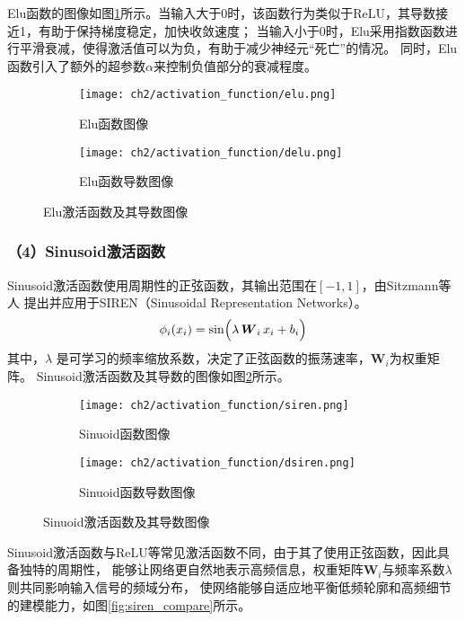 Elu函数的图像如图\ref{fig:elu}所示。当输入大于0时，该函数行为类似于ReLU，其导数接近1，有助于保持梯度稳定，加快收敛速度；
当输入小于0时，Elu采用指数函数进行平滑衰减，使得激活值可以为负，有助于减少神经元“死亡”的情况。
同时，Elu函数引入了额外的超参数$\alpha$来控制负值部分的衰减程度。

\begin{figure}[H]
  \centering
  \begin{subfigure}[t]{0.45\textwidth}
    \centering
    \texttt{[image: ch2/activation\_function/elu.png]}
    \caption{Elu函数图像}
  \end{subfigure}
  \begin{subfigure}[t]{0.45\textwidth}
    \centering
    \texttt{[image: ch2/activation\_function/delu.png]}
    \caption{Elu函数导数图像}
  \end{subfigure}
  \caption{Elu激活函数及其导数图像}
  \label{fig:elu}
\end{figure}

\subsubsection*{（4）Sinusoid激活函数}

Sinusoid激活函数使用周期性的正弦函数，其输出范围在$[-1,1]$，由Sitzmann等人\cite{sitzmann2020implicit}
提出并应用于SIREN（Sinusoidal Representation Networks）。
\begin{equation}\label{eq:siren}
\phi_i(x_i)=\sin\Bigl(\lambda\,{\boldsymbol{W}}_i\,x_i+b_i\Bigr)
\end{equation}
其中，$\lambda$ 是可学习的频率缩放系数，决定了正弦函数的振荡速率，${\boldsymbol{W}}_i$为权重矩阵。
Sinusoid激活函数及其导数的图像如图\ref{fig:sinusoid}所示。
\begin{figure}[H]
  \centering
  \begin{subfigure}[t]{0.45\textwidth}
    \centering
    \texttt{[image: ch2/activation\_function/siren.png]}
    \caption{Sinuoid函数图像}
  \end{subfigure}
  \begin{subfigure}[t]{0.45\textwidth}
    \centering
    \texttt{[image: ch2/activation\_function/dsiren.png]}
    \caption{Sinuoid函数导数图像}
  \end{subfigure}
  \caption{Sinuoid激活函数及其导数图像}
  \label{fig:sinusoid}
\end{figure}

Sinusoid激活函数与ReLU等常见激活函数不同，由于其了使用正弦函数，因此具备独特的周期性，
能够让网络更自然地表示高频信息，权重矩阵${\boldsymbol{W}}_i$与频率系数$\lambda$则共同影响输入信号的频域分布，
使网络能够自适应地平衡低频轮廓和高频细节的建模能力，如图\ref{fig:siren_compare}所示。

